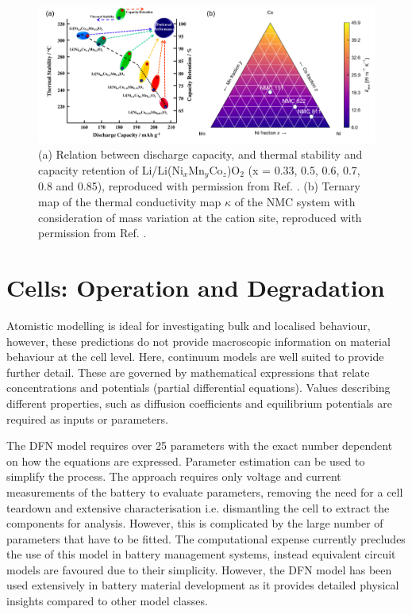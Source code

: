 \documentclass[aps,prb,twocolumn,superscriptaddress,reprint]{revtex4-1}
\begin{document}
\begin{figure}[tb]
  \centering
    \includegraphics[width=12cm]{Figures/P_thermal.png}
    \caption{(a) Relation between discharge capacity, and thermal stability and capacity retention of Li/Li(Ni$_x$Mn$_y$Co$_z$)O$_2$ (x = 0.33, 0.5, 0.6, 0.7, 0.8 and 0.85), reproduced with permission from Ref. . (b) Ternary map of the thermal conductivity map $\kappa$ of the NMC system with consideration of mass variation at the cation site, reproduced with permission from Ref. .}
  \label{figure_thermal}
\end{figure}

\section*{Cells: Operation and Degradation}
Atomistic modelling is ideal for investigating bulk and localised behaviour, however, these predictions do not provide macroscopic information on material behaviour at the cell level. 
Here, continuum models are well suited to provide further detail. 
These are governed by mathematical expressions that relate concentrations and potentials (partial differential equations). 
Values describing different properties, such as diffusion coefficients and equilibrium potentials are required as inputs or parameters.

The DFN model requires over 25 parameters with the exact number dependent on how the equations are expressed.\cite{Kim2011} 
Parameter estimation can be used to simplify the process. 
The approach requires only voltage and current measurements of the battery to evaluate parameters, removing the need for a cell teardown and extensive characterisation i.e. dismantling the cell to extract the components for analysis. \cite{Jin2018} 
However, this is complicated by the large number of parameters that have to be fitted.
The computational expense currently precludes the use of this model in battery management systems, instead equivalent circuit models are favoured due to their simplicity.\cite{Marquis2019} 
However, the DFN model has been used extensively in battery material development as it provides detailed physical insights compared to other model classes.\cite{Dawson2018}
\end{document}
